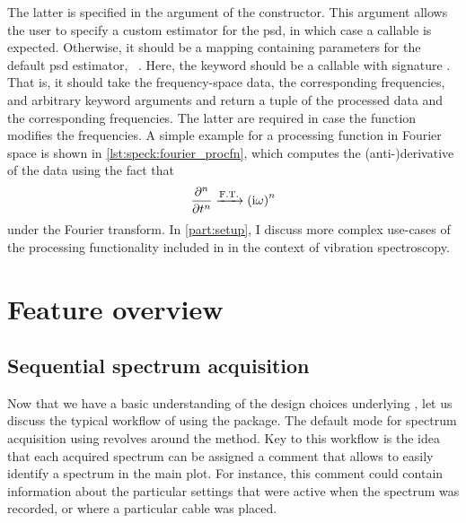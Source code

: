 The latter is specified in the  argument of the  constructor.
This argument allows the user to specify a custom estimator for the \gls{psd}, in which case a callable is expected.
Otherwise, it should be a mapping containing parameters for the default \gls{psd} estimator, ~.
Here, the keyword  should be a callable with signature .
That is, it should take the frequency-space data, the corresponding frequencies, and arbitrary keyword arguments and return a tuple of the processed data and the corresponding frequencies.
The latter are required in case the function modifies the frequencies.
A simple example for a processing function in Fourier space is shown in \cref{lst:speck:fourier_procfn}, which computes the \mbox{(anti-)}derivative of the data using the fact that
\begin{align}\label{eq:speck:fourier_derivative}
    \pdv[n]{t} \xrightarrow{\mathrm{F.T.}} \left(\mathrm{i}\omega\right)^n
\end{align}
under the Fourier transform.
In \cref{part:setup}, I discuss more complex use-cases of the processing functionality included in \pyspeck in the context of vibration spectroscopy.

\section{Feature overview}\label{sec:speck:software:features}
\subsection{Sequential spectrum acquisition}\label{subsec:speck:software:features:sequential}
Now that we have a basic understanding of the design choices underlying \pyspeck, let us discuss the typical workflow of using the package.
The default mode for spectrum acquisition using \pyspeck revolves around the  method.
Key to this workflow is the idea that each acquired spectrum can be assigned a comment that allows to easily identify a spectrum in the main plot.
For instance, this comment could contain information about the particular settings that were active when the spectrum was recorded, or where a particular cable was placed.

